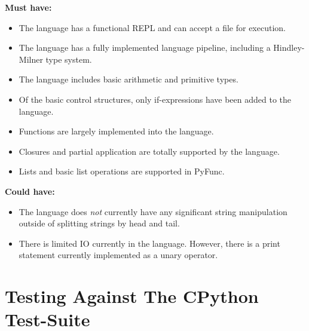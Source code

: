 \documentclass{l4proj}
\begin{document}
\textbf{Must have:}
\begin{itemize}
    \item The language has a functional REPL and can accept a file for execution.
    \item The language has a fully implemented language pipeline, including a Hindley-Milner type system.
    \item The language includes basic arithmetic and primitive types.
    \item Of the basic control structures, only if-expressions have been added to the language.
    \item Functions are largely implemented into the language.
    \item Closures and partial application are totally supported by the language.
    \item Lists and basic list operations are supported in PyFunc.
\end{itemize}

\textbf{Could have:}
\begin{itemize}
    \item The language does \emph{not} currently have any significant string manipulation outside of splitting strings by head and tail.
    \item There is limited IO currently in the language. However, there is a print statement currently implemented as a unary operator.
\end{itemize}




\section{Testing Against The CPython Test-Suite}
\end{document}
